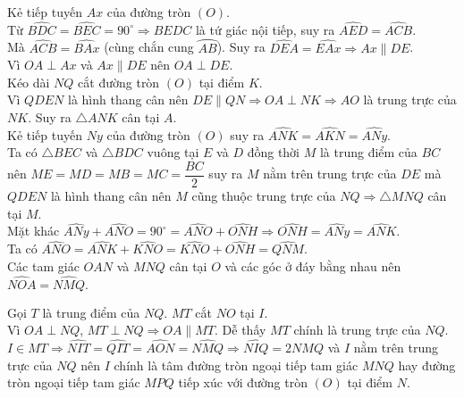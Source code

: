 \begin{ex}
{\begin{listEX}
			Kẻ tiếp tuyến $Ax$ của đường tròn $(O)$.\\
			Từ $\widehat{BDC}=\widehat{BEC}=90^\circ \Rightarrow BEDC$ là tứ giác nội tiếp, suy ra $\widehat{AED}=\widehat{ACB}.$\\
			Mà $\widehat{ACB}=\widehat{BAx}$ (cùng chắn cung $\wideparen{AB}$). Suy ra $\widehat{DEA}=\widehat{EAx}\Rightarrow Ax\parallel DE$.\\
			Vì $OA\perp Ax$ và $Ax\parallel DE$ nên $OA\perp DE.$\\
			Kéo dài $NQ$ cắt đường tròn $(O)$ tại điểm $K$.\\
			Vì $QDEN$ là hình thang cân nên $DE\parallel QN\Rightarrow OA\perp NK\Rightarrow AO$ là trung trực của $NK.$
			Suy ra $\triangle ANK$ cân tại $A$.\\
			Kẻ tiếp tuyến $Ny$ của đường tròn $(O)$ suy ra $\widehat{ANK}=\widehat{AKN}=\widehat{ANy}.$\\
			Ta có $\triangle BEC$ và $\triangle BDC$ vuông tại $E$ và $D$ đồng thời $M$ là trung điểm của $BC$ nên $ME=MD=MB=MC=\dfrac{BC}{2}$ suy ra $M$ nằm trên trung trực của $DE$ mà $QDEN$ là hình thang cân nên $M$ cũng thuộc trung trực của $NQ\Rightarrow \triangle MNQ$ cân tại $M$.\\
			Mặt khác $\widehat{ANy}+\widehat{ANO}=90^\circ =\widehat{ANO}+\widehat{ONH}\Rightarrow \widehat{ONH}=\widehat{ANy}=\widehat{ANK}.$\\
			Ta có $\widehat{ANO}=\widehat{ANK}+\widehat{KNO}=\widehat{KNO}+\widehat{ONH}=\widehat{QNM}$.\\
			Các tam giác $OAN$ và $MNQ$ cân tại $O$ và các góc ở đáy bằng nhau nên $\widehat{NOA}=\widehat{NMQ}.$
			
			Gọi $T$ là trung điểm của $NQ$. $MT$ cắt $NO$ tại $I$.\\
			Vì $OA\perp NQ$, $MT\perp NQ\Rightarrow OA\parallel MT.$
			Dễ thấy $MT$ chính là trung trực của $NQ$.\\
			$I\in MT\Rightarrow \widehat{NIT}=\widehat{QIT}=\widehat{AON}=\widehat{NMQ}\Rightarrow \widehat{NIQ}=2\widehat{NMQ}$ và $I$ nằm trên trung trực của $NQ$ nên $I$  chính là tâm đường tròn ngoại tiếp tam giác $MNQ$ hay đường tròn ngoại tiếp tam giác $MPQ$ tiếp xúc với đường tròn $(O)$ tại điểm $N$.\\
			
		\end{listEX}
	}
\end{ex}

